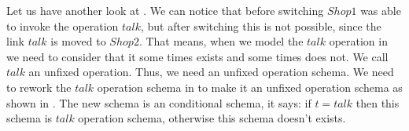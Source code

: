 Let us have another look at . We can notice that before switching $Shop1$ was able to invoke the operation $talk$, but after switching this is not possible, since the link $talk$ is moved to $Shop2$. That means, when we model the $talk$ operation in \oz{} we need to consider that it some times exists and some times does not. We call $talk$ an unfixed operation. Thus, we need an unfixed operation schema. We need to rework the $talk$ operation schema in  to make it an unfixed operation schema as shown in . The new schema is an conditional schema, it says: if $t = talk$ then this schema is $talk$ operation schema, otherwise this schema doesn't exists.

